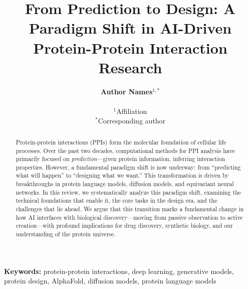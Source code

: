 \documentclass[11pt,a4paper]{article}
\title{\textbf{From Prediction to Design: A Paradigm Shift in AI-Driven Protein-Protein Interaction Research}}
\author{
\textbf{Author Names}$^{1,*}$\\
\\
$^1$Affiliation\\
$^*$Corresponding author
}
\date{}
\begin{document}
\maketitle

\begin{abstract}
\noindent
Protein-protein interactions (PPIs) form the molecular foundation of cellular life processes. Over the past two decades, computational methods for PPI analysis have primarily focused on \textit{prediction}---given protein information, inferring interaction properties. However, a fundamental paradigm shift is now underway: from ``predicting what will happen'' to ``designing what we want.'' This transformation is driven by breakthroughs in protein language models, diffusion models, and equivariant neural networks. In this review, we systematically analyze this paradigm shift, examining the technical foundations that enable it, the core tasks in the design era, and the challenges that lie ahead. We argue that this transition marks a fundamental change in how AI interfaces with biological discovery---moving from passive observation to active creation---with profound implications for drug discovery, synthetic biology, and our understanding of the protein universe.
\end{abstract}

\noindent\textbf{Keywords:} protein-protein interactions, deep learning, generative models, protein design, AlphaFold, diffusion models, protein language models

\vspace{1em}

\tableofcontents
\newpage












\end{document}
